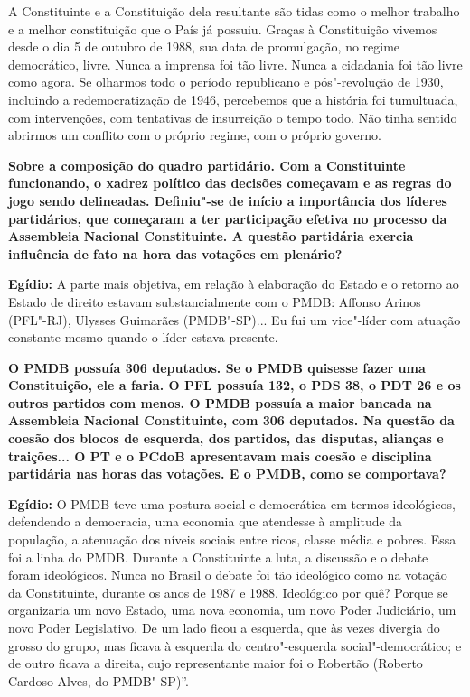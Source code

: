 A Constituinte e a Constituição dela resultante são tidas como o melhor
trabalho e a melhor constituição que o País já possuiu. Graças à
Constituição vivemos desde o dia 5 de outubro de 1988, sua data de
promulgação, no regime democrático, livre. Nunca a imprensa foi tão
livre. Nunca a cidadania foi tão livre como agora. Se olharmos todo o
período republicano e pós"-revolução de 1930, incluindo a
redemocratização de 1946, percebemos que a história foi tumultuada, com
intervenções, com tentativas de insurreição o tempo todo. Não tinha
sentido abrirmos um conflito com o próprio regime, com o próprio
governo.

\textbf{Sobre a composição do quadro partidário. Com a Constituinte
funcionando, o xadrez político das decisões começavam e as regras do
jogo sendo delineadas. Definiu"-se de início a importância dos líderes
partidários, que começaram a ter participação efetiva no processo da
Assembleia Nacional Constituinte. A questão partidária exercia
influência de fato na hora das votações em plenário?}

\textbf{Egídio:} A parte mais objetiva, em relação à elaboração do
Estado e o retorno ao Estado de direito estavam substancialmente com o
PMDB: Affonso Arinos (PFL"-RJ), Ulysses Guimarães (PMDB"-SP)... Eu fui um
vice"-líder com atuação constante mesmo quando o líder estava presente.

\textbf{O PMDB possuía 306 deputados. Se o PMDB quisesse fazer uma
Constituição, ele a faria. O PFL possuía 132, o PDS 38, o PDT 26 e os
outros partidos com menos. O PMDB possuía a maior bancada na Assembleia
Nacional Constituinte, com 306 deputados. Na questão da coesão dos
blocos de esquerda, dos partidos, das disputas, alianças e traições... O
PT e o PCdoB apresentavam mais coesão e disciplina partidária nas horas
das votações. E o PMDB, como se comportava?}

\textbf{Egídio:} O PMDB teve uma postura social e democrática em termos
ideológicos, defendendo a democracia, uma economia que atendesse à
amplitude da população, a atenuação dos níveis sociais entre ricos,
classe média e pobres. Essa foi a linha do PMDB. Durante a Constituinte
a luta, a discussão e o debate foram ideológicos. Nunca no Brasil o
debate foi tão ideológico como na votação da Constituinte, durante os
anos de 1987 e 1988. Ideológico por quê? Porque se organizaria um novo
Estado, uma nova economia, um novo Poder Judiciário, um novo Poder
Legislativo. De um lado ficou a esquerda, que às vezes divergia do
grosso do grupo, mas ficava à esquerda do centro"-esquerda
social"-democrático; e de outro ficava a direita, cujo representante
maior foi o Robertão (Roberto Cardoso Alves, do PMDB"-SP)''.

